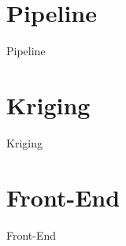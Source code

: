\documentclass{beamer}
\begin{document}
\section{Pipeline}
\begin{frame}{Pipeline}
\end{frame}

\section{Kriging}
\begin{frame}{Kriging}
\end{frame}

\section{Front-End}
\begin{frame}{Front-End}
\end{frame}
\end{document}
